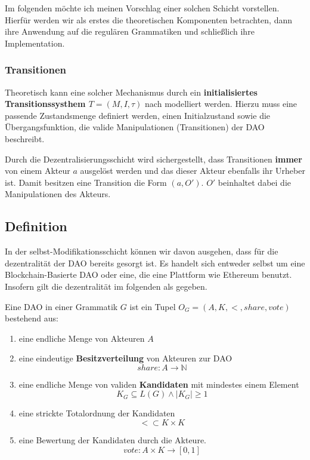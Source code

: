 \documentclass[a4paper,12pt]{report}
\begin{document}
Im folgenden möchte ich meinen Vorschlag einer solchen Schicht vorstellen. Hierfür werden wir als erstes die theoretischen Komponenten betrachten, dann ihre Anwendung auf die regulären Grammatiken und schließlich ihre Implementation.

\subsubsection*{Transitionen}
Theoretisch kann eine solcher Mechanismus durch ein \textbf{initialisiertes Transitionssysthem $T=(M,I,\tau)$} nach \cite{Glausch} modelliert werden. Hierzu muss eine passende Zustandsmenge definiert werden, einen Initialzustand sowie die Übergangsfunktion, die valide Manipulationen (Transitionen) der DAO beschreibt.

Durch die Dezentralisierungsschicht wird sichergestellt, dass Transitionen \textbf{immer} von einem Akteur $a$ ausgelöst werden und das dieser Akteur ebenfalls ihr Urheber ist. Damit besitzen eine Transition die Form $(a, O')$. $O'$ beinhaltet dabei die Manipulationen des Akteurs.


\subsection{Definition}
In der selbst-Modifikationsschicht können wir davon ausgehen, dass für die dezentralität der DAO bereits gesorgt ist. Es handelt sich entweder selbst um eine Blockchain-Basierte DAO oder eine, die eine Plattform wie Ethereum benutzt. Insofern gilt die dezentralität im folgenden als gegeben.

Eine DAO in einer Grammatik $G$ ist ein Tupel $O_G=(A, K, <, share, vote)$ bestehend aus:

\begin{enumerate}
\item eine endliche Menge von Akteuren $A$
\item eine eindeutige \textbf{Besitzverteilung} von Akteuren zur DAO
  \[share: A \rightarrow \mathbb{N}\]
\item eine endliche Menge von validen \textbf{Kandidaten} mit mindestes einem Element 
  \[K_G \subseteq L(G) \land |K_G| \geq 1\] 
\item eine strickte Totalordnung der Kandidaten 
  \[ < \subset K\times K \] 
\item eine Bewertung der Kandidaten durch die Akteure. 
  \[vote: A\times K \rightarrow [0,1]\]
\end{enumerate}
\end{document}
